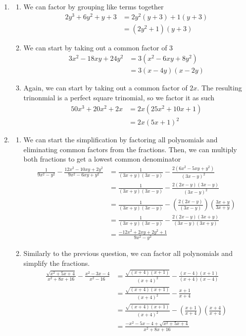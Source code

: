 \documentclass[11pt, letterpaper, twoside, tikz]{article}
\begin{document}
\begin{enumerate}
\begin{enumerate}[label=(\alph*)]
\end{enumerate}
\item \begin{enumerate}[label=(\alph*)]
\item We can factor by grouping like terms together
\begin{align*}
2y^3+6y^2+y+3&= 2y^2(y+3)+1(y+3)\\
&= (2y^2+1)(y+3)
\end{align*}
\item We can start by taking out a common factor of 3
\begin{align*}
3x^2-18xy+24y^2&= 3(x^2-6xy+8y^2)\\
&= 3(x-4y)(x-2y)
\end{align*}

\item Again, we can start by taking out a common factor of $2x$. The resulting trinonmial is a perfect square trinomial, so we factor it as such
\begin{align*}
50x^3+20x^2+2x&= 2x(25x^2+10x+1)\\
&= 2x(5x+1)^2
\end{align*}
\end{enumerate}
\item
\begin{enumerate}[label=(\alph*)]
\item We can start the simplification by factoring all polynomials and eliminating common factors from the fractions. Then, we can multiply both fractions to get a lowest common denominator
\begin{align*}
\frac{1}{9x^2-y^2}-\frac{12x^2-10xy+2y^2}{9x^2-6xy+y^2}&= \frac{1}{(3x+y)(3x-y)}-\frac{2(6x^2-5xy+y^2)}{(3x-y)^2}\\
&= \frac{1}{(3x+y)(3x-y)}-\frac{2(2x-y)(3x-y)}{(3x-y)^2}\\
&= \frac{1}{(3x+y)(3x-y)}-\left( \frac{2(2x-y)}{(3x-y)}\right) \left(\frac {3x+y}{3x+y}\right)\\
&= \frac{1}{(3x+y)(3x-y)}-\frac{2(2x-y)(3x+y)}{(3x-y)(3x+y)}\\
&= \frac {-12x^2+2xy+2y^2+1}{9x^2-y^2}
\end{align*}
\pagebreak
\item Similarly to the previous question, we can factor all polynomials and simplify the fractions.
\begin{align*}
\frac{\sqrt{x^2+5x+4}}{x^2+8x+16}-\frac{x^2-3x-4}{x^2-16}&= \frac{\sqrt{(x+4)(x+1)}}{(x+4)^2}-\frac{(x-4)(x+1)}{(x+4)(x-4)}\\
&= \frac{\sqrt{(x+4)(x+1)}}{(x+4)^2}-\frac{x+1}{x+4}\\
&= \frac{\sqrt{(x+4)(x+1)}}{(x+4)^2}-\left( \frac{x+1}{x+4}\right) \left( \frac{x+4}{x+4}\right)\\
&= \frac{-x^2-5x-4+\sqrt{x^2+5x+4}}{x^2+8x+16}
\end{align*}


\end{enumerate}
\end{enumerate}
\end{document}
